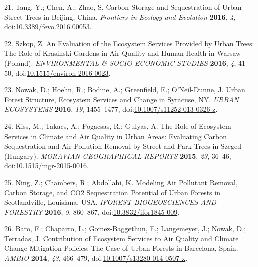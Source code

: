 \documentclass[
]{article}
\begin{document}
\leavevmode\hypertarget{ref-tang_carbon_2016}{}%
21. Tang, Y.; Chen, A.; Zhao, S. Carbon Storage and Sequestration of Urban Street Trees in Beijing, China. \emph{Frontiers in Ecology and Evolution} \textbf{2016}, \emph{4}, doi:\href{https://doi.org/10.3389/fevo.2016.00053}{10.3389/fevo.2016.00053}.

\leavevmode\hypertarget{ref-szkop_evaluation_2016}{}%
22. Szkop, Z. An Evaluation of the Ecosystem Services Provided by Urban Trees: The Role of Krasinski Gardens in Air Quality and Human Health in Warsaw (Poland). \emph{ENVIRONMENTAL \& SOCIO-ECONOMIC STUDIES} \textbf{2016}, \emph{4}, 41--50, doi:\href{https://doi.org/10.1515/environ-2016-0023}{10.1515/environ-2016-0023}.

\leavevmode\hypertarget{ref-nowak_urban_2016}{}%
23. Nowak, D.; Hoehn, R.; Bodine, A.; Greenfield, E.; O'Neil-Dunne, J. Urban Forest Structure, Ecosystem Services and Change in Syracuse, NY. \emph{URBAN ECOSYSTEMS} \textbf{2016}, \emph{19}, 1455--1477, doi:\href{https://doi.org/10.1007/s11252-013-0326-z}{10.1007/s11252-013-0326-z}.

\leavevmode\hypertarget{ref-kiss_role_2015}{}%
24. Kiss, M.; Takacs, A.; Pogacsas, R.; Gulyas, A. The Role of Ecosystem Services in Climate and Air Quality in Urban Areas: Evaluating Carbon Sequestration and Air Pollution Removal by Street and Park Trees in Szeged (Hungary). \emph{MORAVIAN GEOGRAPHICAL REPORTS} \textbf{2015}, \emph{23}, 36--46, doi:\href{https://doi.org/10.1515/mgr-2015-0016}{10.1515/mgr-2015-0016}.

\leavevmode\hypertarget{ref-ning_modeling_2016}{}%
25. Ning, Z.; Chambers, R.; Abdollahi, K. Modeling Air Pollutant Removal, Carbon Storage, and CO2 Sequestration Potential of Urban Forests in Scotlandville, Louisiana, USA. \emph{IFOREST-BIOGEOSCIENCES AND FORESTRY} \textbf{2016}, \emph{9}, 860--867, doi:\href{https://doi.org/10.3832/ifor1845-009}{10.3832/ifor1845-009}.

\leavevmode\hypertarget{ref-baro_contribution_2014}{}%
26. Baro, F.; Chaparro, L.; Gomez-Baggethun, E.; Langemeyer, J.; Nowak, D.; Terradas, J. Contribution of Ecosystem Services to Air Quality and Climate Change Mitigation Policies: The Case of Urban Forests in Barcelona, Spain. \emph{AMBIO} \textbf{2014}, \emph{43}, 466--479, doi:\href{https://doi.org/10.1007/s13280-014-0507-x}{10.1007/s13280-014-0507-x}.
\end{document}
